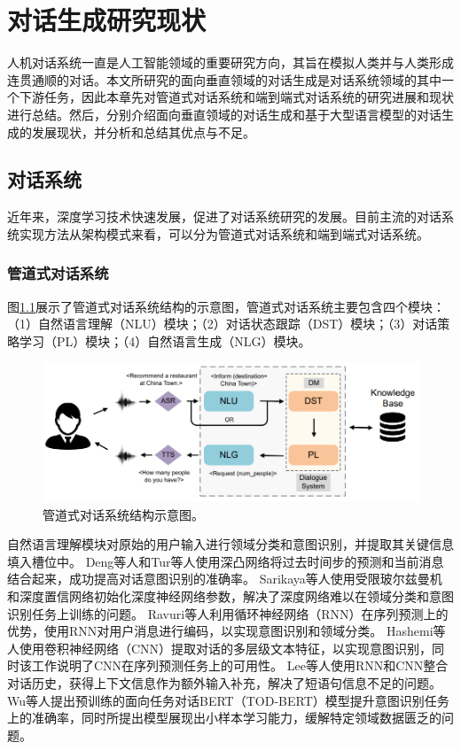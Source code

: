 \chapter{对话生成研究现状}

人机对话系统一直是人工智能领域的重要研究方向，其旨在模拟人类并与人类形成连贯通顺的对话。本文所研究的面向垂直领域的对话生成是对话系统领域的其中一个下游任务，因此本章先对管道式对话系统和端到端式对话系统的研究进展和现状进行总结。然后，分别介绍面向垂直领域的对话生成和基于大型语言模型的对话生成的发展现状，并分析和总结其优点与不足。

\section{对话系统}

近年来，深度学习技术快速发展，促进了对话系统研究的发展。目前主流的对话系统实现方法从架构模式来看，可以分为管道式对话系统和端到端式对话系统。

\subsection{管道式对话系统}

图\ref{pipeline_dialogue_system}展示了管道式对话系统结构的示意图，管道式对话系统主要包含四个模块：（1）自然语言理解（NLU）模块；（2）对话状态跟踪（DST）模块；（3）对话策略学习（PL）模块；（4）自然语言生成（NLG）模块。

\begin{figure}[htbp]
	\centering
	\includegraphics[scale=0.55]{Fig/pipeline_dialogue_system.png}
	\caption{\label{pipeline_dialogue_system}管道式对话系统结构示意图\cite{DBLP:journals/air/NiYPXC23}。}
\end{figure}

自然语言理解模块对原始的用户输入进行领域分类和意图识别，并提取其关键信息填入槽位中。
Deng等人\cite{DBLP:conf/slt/DengTHH12}和Tur等人\cite{DBLP:conf/icassp/TurDHH12}使用深凸网络将过去时间步的预测和当前消息结合起来，成功提高对话意图识别的准确率。
Sarikaya等人\cite{DBLP:journals/taslp/SarikayaHD14}使用受限玻尔兹曼机和深度置信网络初始化深度神经网络参数，解决了深度网络难以在领域分类和意图识别任务上训练的问题。
Ravuri等人\cite{DBLP:conf/interspeech/RavuriS15}利用循环神经网络（RNN）在序列预测上的优势，使用RNN对用户消息进行编码，以实现意图识别和领域分类。
Hashemi等人\cite{hashemi2016query}使用卷积神经网络（CNN）提取对话的多层级文本特征，以实现意图识别，同时该工作说明了CNN在序列预测任务上的可用性。
Lee等人\cite{DBLP:conf/naacl/LeeD16}使用RNN和CNN整合对话历史，获得上下文信息作为额外输入补充，解决了短语句信息不足的问题。
Wu等人\cite{DBLP:journals/corr/abs-2004-06871}提出预训练的面向任务对话BERT（TOD-BERT）模型提升意图识别任务上的准确率，同时所提出模型展现出小样本学习能力，缓解特定领域数据匮乏的问题。

